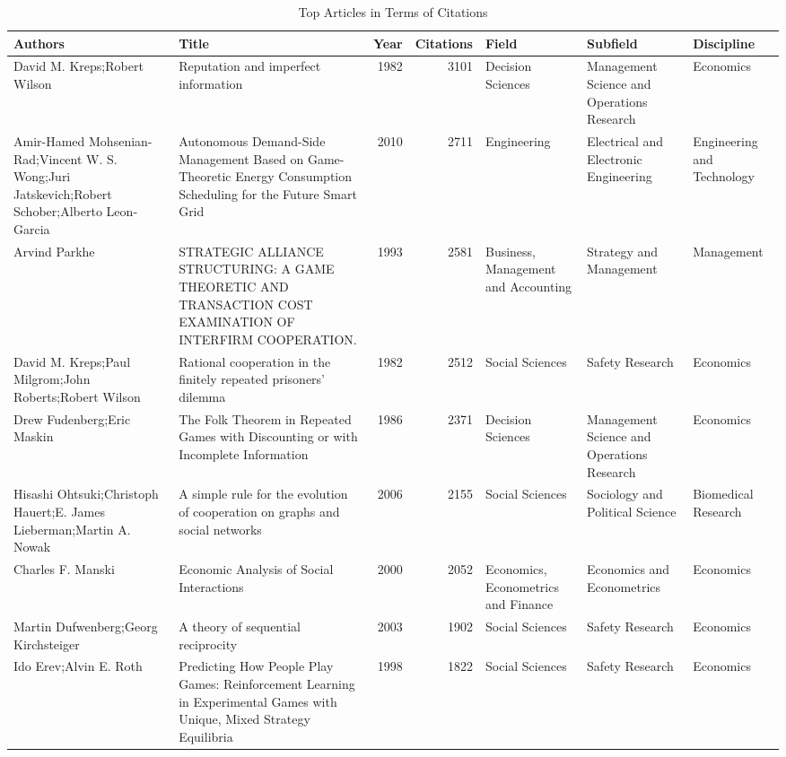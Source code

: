 \documentclass[
  12pt,
]{article}
\begin{document}
\begin{longtable}[t]{>{\raggedright\arraybackslash}p{2.75cm}>{\raggedright\arraybackslash}p{2.75cm}rr>{\raggedright\arraybackslash}p{2.75cm}>{\raggedright\arraybackslash}p{2.75cm}>{\raggedright\arraybackslash}p{2.75cm}}
\caption{\label{tab:articles}Top Articles in Terms of Citations}\\
\toprule
Authors & Title & Year & Citations & Field & Subfield & Discipline\\
\midrule
David M. Kreps;Robert Wilson & Reputation and imperfect information & 1982 & 3101 & Decision Sciences & Management Science and Operations Research & Economics\\
Amir-Hamed Mohsenian-Rad;Vincent W. S. Wong;Juri Jatskevich;Robert Schober;Alberto Leon‐Garcia & Autonomous Demand-Side Management Based on Game-Theoretic Energy Consumption Scheduling for the Future Smart Grid & 2010 & 2711 & Engineering & Electrical and Electronic Engineering & Engineering and Technology\\
Arvind Parkhe & STRATEGIC ALLIANCE STRUCTURING: A GAME THEORETIC AND TRANSACTION COST EXAMINATION OF INTERFIRM COOPERATION. & 1993 & 2581 & Business, Management and Accounting & Strategy and Management & Management\\
David M. Kreps;Paul Milgrom;John Roberts;Robert Wilson & Rational cooperation in the finitely repeated prisoners' dilemma & 1982 & 2512 & Social Sciences & Safety Research & Economics\\
Drew Fudenberg;Eric Maskin & The Folk Theorem in Repeated Games with Discounting or with Incomplete Information & 1986 & 2371 & Decision Sciences & Management Science and Operations Research & Economics\\
Hisashi Ohtsuki;Christoph Hauert;E. James Lieberman;Martin A. Nowak & A simple rule for the evolution of cooperation on graphs and social networks & 2006 & 2155 & Social Sciences & Sociology and Political Science & Biomedical Research\\
Charles F. Manski & Economic Analysis of Social Interactions & 2000 & 2052 & Economics, Econometrics and Finance & Economics and Econometrics & Economics\\
Martin Dufwenberg;Georg Kirchsteiger & A theory of sequential reciprocity & 2003 & 1902 & Social Sciences & Safety Research & Economics\\
Ido Erev;Alvin E. Roth & Predicting How People Play Games: Reinforcement Learning in Experimental Games with Unique, Mixed Strategy Equilibria & 1998 & 1822 & Social Sciences & Safety Research & Economics\\

\end{longtable}
\end{document}
